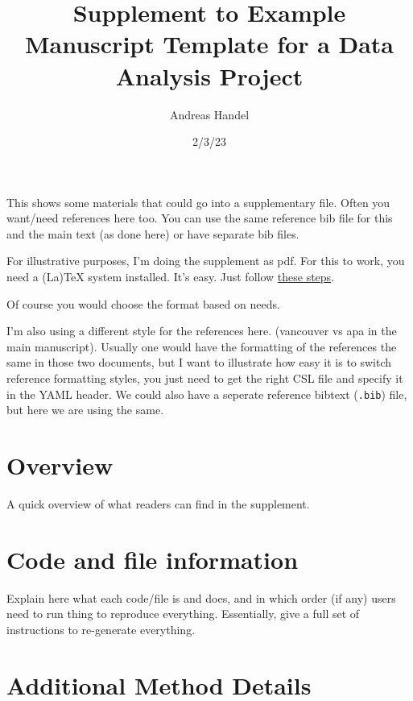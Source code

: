 \documentclass[
  letterpaper,
  DIV=11,
  numbers=noendperiod]{scrartcl}
\title{Supplement to Example Manuscript Template for a Data Analysis
Project}
\author{Andreas Handel}
\date{2/3/23}
\begin{document}
\maketitle
\ifdefined\Shaded\renewenvironment{Shaded}{\begin{tcolorbox}[breakable, frame hidden, borderline west={3pt}{0pt}{shadecolor}, interior hidden, enhanced, sharp corners, boxrule=0pt]}{\end{tcolorbox}}\fi

This shows some materials that could go into a supplementary file. Often
you want/need references here too. You can use the same reference bib
file for this and the main text (as done here) or have separate bib
files.

For illustrative purposes, I'm doing the supplement as pdf. For this to
work, you need a (La)TeX system installed. It's easy. Just follow
\href{https://quarto.org/docs/output-formats/pdf-basics.html}{these
steps}.

Of course you would choose the format based on needs.

I'm also using a different style for the references here. (vancouver vs
apa in the main manuscript). Usually one would have the formatting of
the references the same in those two documents, but I want to illustrate
how easy it is to switch reference formatting styles, you just need to
get the right CSL file and specify it in the YAML header. We could also
have a seperate reference bibtext (\texttt{.bib}) file, but here we are
using the same.

\hypertarget{overview}{%
\section{Overview}\label{overview}}

A quick overview of what readers can find in the supplement.

\hypertarget{code-and-file-information}{%
\section{Code and file information}\label{code-and-file-information}}

Explain here what each code/file is and does, and in which order (if
any) users need to run thing to reproduce everything. Essentially, give
a full set of instructions to re-generate everything.

\newpage{}

\hypertarget{additional-method-details}{%
\section{Additional Method Details}\label{additional-method-details}}
\end{document}

